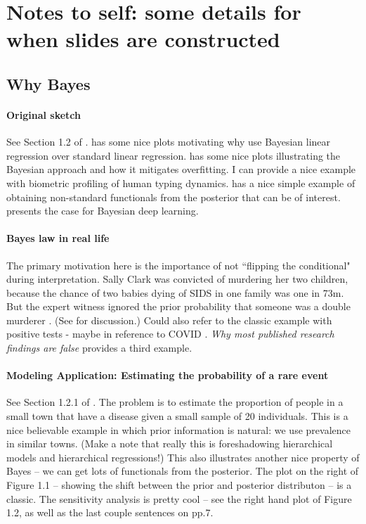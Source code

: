 \documentclass{article} %
\begin{document}
\section{Notes to self:  some details for when slides are constructed}

\subsection{Why Bayes}

\paragraph{Original sketch} See Section 1.2 of \cite{hoff2009first}.   \cite{bishop2006pattern} has some nice plots motivating why use Bayesian linear regression over standard linear regression.   \cite{ghahramani2013bayesian}  has some nice plots illustrating the Bayesian approach and how it mitigates overfitting.   I can provide a nice example with biometric profiling of human typing dynamics.   \cite{held2006bayesian} has a nice simple example of obtaining non-standard functionals from the posterior that can be of interest.   \cite{wilson2020case} presents the case for Bayesian deep learning.  

\paragraph{Bayes law in real life}
The primary motivation here is the importance of not ``flipping the conditional" during interpretation.   Sally Clark was convicted of murdering her two children,  because the chance of two babies dying of SIDS in one family was one in 73m.   But the expert witness ignored the prior probability that someone was a double murderer \cite{guardianXXXXobscure}.  (See \cite{hill2004multiple} for discussion.)      Could also refer to the classic example with positive tests - maybe in reference to COVID \cite{guardianXXXXobscure}.     \textit{Why most published research findings are false} \cite{ioannidis2005most} provides a third example. 

\paragraph{Modeling Application: Estimating the probability of a rare event}
See Section 1.2.1 of \cite{hoff2009first}.  The problem is to estimate the proportion of people in a small town that have a disease given a small sample of 20 individuals.     This is a nice believable example in which prior information is natural: we use prevalence in similar towns.  (Make a note that really this is foreshadowing hierarchical models and hierarchical regressions!)  This also illustrates another nice property of Bayes  -- we can get lots of functionals from the posterior.  The plot on the right of Figure 1.1 -- showing the shift between the prior and posterior distributon -- is a classic.   The sensitivity analysis is pretty cool -- see the right hand plot of Figure 1.2,  as well as the last couple sentences on pp.7.    
\end{document}

